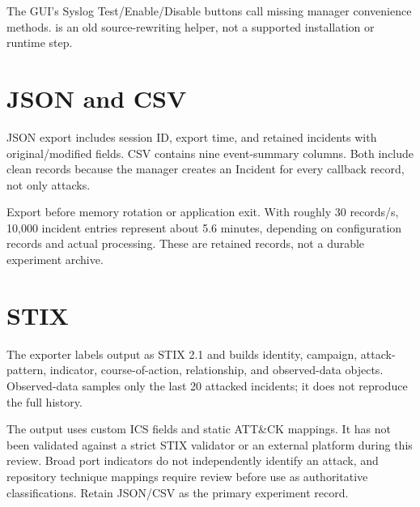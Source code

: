 The GUI's Syslog Test/Enable/Disable buttons call missing manager convenience methods.  is an old source-rewriting helper, not a supported installation or runtime step.

\section*{JSON and CSV}
JSON export includes session ID, export time, and retained incidents with original/modified fields. CSV contains nine event-summary columns. Both include clean records because the manager creates an Incident for every callback record, not only attacks.

Export before memory rotation or application exit. With roughly 30 records/s, 10,000 incident entries represent about 5.6 minutes, depending on configuration records and actual processing. These are retained records, not a durable experiment archive.

\section*{STIX}
The exporter labels output as STIX 2.1 and builds identity, campaign, attack-pattern, indicator, course-of-action, relationship, and observed-data objects. Observed-data samples only the last 20 attacked incidents; it does not reproduce the full history.

The output uses custom ICS fields and static ATT\&CK mappings. It has not been validated against a strict STIX validator or an external platform during this review. Broad port indicators do not independently identify an attack, and repository technique mappings require review before use as authoritative classifications. Retain JSON/CSV as the primary experiment record.

